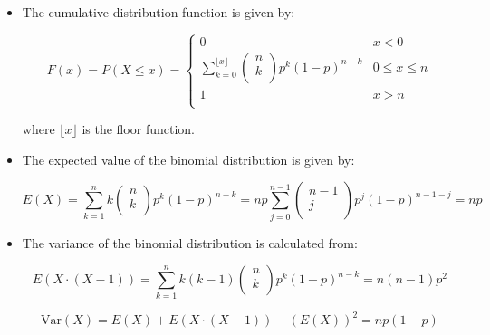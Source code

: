 \documentclass[12pt]{report}
\renewcommand{\_}{\kern-1.5pt\textunderscore\kern-1.5pt}
\begin{document}
\begin{itemize}
\begin{itemize}
	\item The cumulative distribution function is given by:\par

 \[ F \left( x \right) =P \left( X \leq x \right) = \left\{ \begin{matrix}
0  &  x<0\\
 \sum _{k=0}^{ \lfloor x \rfloor } \left( \begin{matrix}
n\\
k\\
\end{matrix}
 \right) p^{k} \left( 1-p \right) ^{n-k}  &  0 \leq x \leq n\\
1  &  x>n\\
\end{matrix}
  \] \par

where  \(  \lfloor x \rfloor  \)  is the floor function.\par

	\item The expected value of the binomial distribution is given by:\par

 \[ E \left( X \right) = \sum _{k=1}^{n}k \left( \begin{matrix}
n\\
k\\
\end{matrix}
 \right) p^{k} \left( 1-p \right) ^{n-k}=np \sum _{j=0}^{n-1} \left( \begin{matrix}
n-1\\
j\\
\end{matrix}
 \right) p^{j} \left( 1-p \right) ^{n-1-j}=np \] \par

	\item The variance of the binomial distribution is calculated from:\par

 \[ E \left( X \cdot  \left( X-1 \right)  \right) = \sum _{k=1}^{n}k \left( k-1 \right)  \left( \begin{matrix}
n\\
k\\
\end{matrix}
 \right) p^{k} \left( 1-p \right) ^{n-k}=n \left( n-1 \right) p^{2} \] \par

 \[ \mathrm{Var} \left( X \right) =E \left( X \right) +E \left( X \cdot  \left( X-1 \right)  \right) - \left( E \left( X \right)  \right) ^{2}=np \left( 1-p \right)  \] \par


\end{itemize}
\end{itemize}
\end{document}
